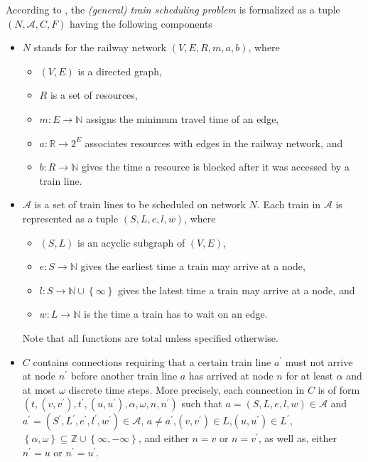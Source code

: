 \documentclass{article}
\begin{document}
According to \cite{DBLP:journals/corr/abs-2003-08598},  the \emph{(general) train scheduling problem} is formalized as a tuple $(N, \mathcal{A}, C, F)$ having the following components
\begin{itemize}
    \item $N$ stands for the railway network $(V, E, R, m, a, b)$, where
        \begin{itemize}
            \item $(V, E)$ is a directed graph,
            \item $R$ is a set of resources,
            \item $m:E\to\mathbb{N}$ assigns the minimum travel time of an edge,
            \item $a: \mathbb{R}\to 2^E$ associates resources with edges in the railway network, and
            \item $b:R\to \mathbb{N}$ gives the time a resource is blocked after it was accessed by a train line.
        \end{itemize}
    \item $\mathcal{A}$ is a set of train lines to be scheduled on network $N$. Each train in $\mathcal{A}$ is represented as a tuple $(S, L, e, l, w)$, where
        \begin{itemize}
            \item $(S, L)$ is an acyclic subgraph of $(V, E)$,
            \item $e:S \to \mathbb{N}$ gives the earliest time a train may arrive at a node,
            \item $l:S\to \mathbb{N} \cup \left\{\infty\right\}$ gives the latest time a train may arrive at a node, and
            \item $w:L\to \mathbb{N}$ is the time a train has to wait on an edge.
        \end{itemize}
        Note that all functions are total unless specified otherwise.
        \item $C$ contains connections requiring that a certain train line $a^\prime$ must not arrive at node $n^\prime$ before another train line $a $ has arrived at node $n$ for at least $\alpha$ and at most $\omega$ discrete time steps. More precisely, each connection in $C$ is of form $(t,(v, v^\prime), t^\prime,(u, u^\prime), \alpha, \omega, n, n^\prime)$ such that $a= (S, L, e, l, w)\in \mathcal{A}$ and $a^\prime= (S^\prime, L^\prime, e^\prime, l^\prime, w^\prime)\in \mathcal{A}$, $a\not=a^\prime$,$(v, v^\prime)\in L$,$(u, u^\prime)\in L^\prime$,$\left\{\alpha,\omega\right\} \subseteq \mathbb{Z} \cup \left\{\infty,-\infty\right\}$, and either $n=v$ or $n=v^\prime$, as well as, either $n^\prime=u$ or $n^\prime=u^\prime$.

\end{itemize}
\end{document}
